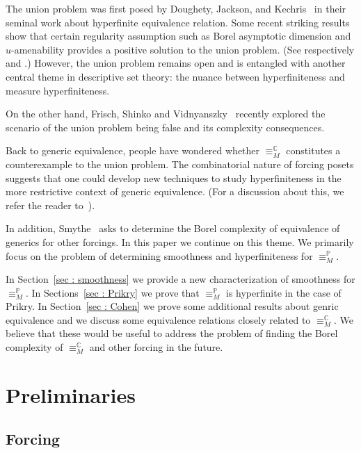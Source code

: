 \documentclass{amsart}
\theoremstyle{definition}
\theoremstyle{remark}
\begin{document}
The union problem was first posed by Doughety, Jackson, and Kechris~\cite{DouJacKec} in their seminal work about hyperfinite equivalence relation. Some recent striking results show that certain regularity assumption such as Borel asymptotic dimension and \(u\)-amenability  provides a positive solution to the union problem. (See respectively \cite{CJMSTD} and \cite{NarVac}.) However, the union problem remains open and is entangled with another central theme in descriptive set theory: the nuance between hyperfiniteness and measure hyperfiniteness.

On the other hand, Frisch, Shinko and Vidnyanszky~\cite{FriShiVid} recently explored the scenario of the union problem being false and its complexity consequences. 

Back to generic equivalence, people have wondered whether \(\equiv_{M}^\mathbb{C}\) constitutes a counterexample to the union problem. The combinatorial nature of forcing posets suggests that one could develop new techniques to study hyperfiniteness in the more restrictive context of generic equivalence. (For a discussion about this, we refer the reader to~\cite[Page~82]{Kec24}). 

In addition, Smythe~\cite[Question~1]{Smy22} asks to determine the Borel complexity of equivalence of generics for other forcings. In this paper we continue on this theme. We primarily focus on the problem of determining smoothness and hyperfiniteness for \(\equiv^\mathbb{P}_M\).

In Section~\ref{sec : smoothness} we provide a new characterization of smoothness for \(\equiv_{M}^\mathbb{P}\). In Sections~\ref{sec : Prikry}  we prove that \(\equiv_{M}^\mathbb{P}\) is hyperfinite in the case of Prikry. In Section~\ref{sec : Cohen} we prove some additional results about genric equivalence and we discuss some equivalence relations closely related to \(\equiv^\mathbb{C}_M\). We believe that these would be useful to address the problem of finding the Borel complexity of \(\equiv^\mathbb{C}_M\) and other forcing in the future.




\section{Preliminaries}


\subsection{Forcing}
\end{document}
